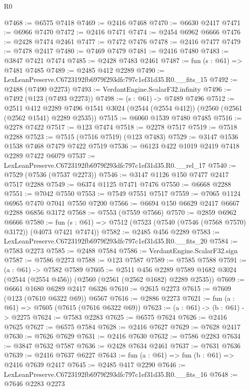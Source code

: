 \begin{lexlean}{R0}
\begin{coremodule}
@7468 := @6575 @7418
@7469 := @2416 @7468
@7470 := @6630 @2417
@7471 := @6966 @7470
@7472 := @2416 @7471
@7474 := @2454 @6962 @6666
@7476 := @2428 @7474 @2461
@7477 := @7472 @7476
@7478 := @2416 @7477
@7479 := @7478 @2417
@7480 := @7469 @7479
@7481 := @2416 @7480
@7483 := @3847 @7421 @7474
@7485 := @2428 @7483 @2461
@7487 := fun (s : @61) => @7481 @7485
@7489 := @2485 @412 @2289
@7490 := LexLeanPreserve.C6723192fb6979f293dfc797c1ef31d35.R0.__fits_15
@7492 := @2488 (@7490 @2273)
@7493 := VerdantEngine.ScalarF32.infinity
@7496 := @7492 (@123 (@7493 @2273))
@7498 := (s : @61) -> @7489 @7496
@7512 := @2511
    @412
    @2289
    @7496
    @1541
    @3024
    (@2544 (@2554 @412))
    (@2560 (@2561 (@2562 @1541) @2289 @2535))
@7515 := @6060 @1539 @7480 @7485
@7516 := @2278 @7422
@7517 := @123 @7474
@7518 := @2278 @7517
@7519 := @7518 @2288
@7523 := @7515 (@7516 @7519) (@123 @7483)
@7529 := @3147 @1536 @1538 @7468 @7479 @7422 @7519
@7536 := @6123 @422 @1019 @2419 @7418 @2289 @7422 @6079
@7537 := LexLeanPreserve.C6723192fb6979f293dfc797c1ef31d35.R0.__rel_17
@7540 := @7529 (@7536 (@7537 @2273))
@7546 := @3147 @1126 @150 @7477 @2417 @7517 @2288
@7549 := @6374 @1125 @7471 @7476
@7550 := @6668 @2288
@7551 := @7042 @7550
@7553 := @7549 @7551 @7517
@7559 := @7065 @1124 @6965 @7470 @7041 @7550 @7200
@7566 := @6694 @150 @6629 @2417 @6667 @2288 @6856 @3172
@7568 := @7553 (@7559 @7566)
@7570 := @2859 @6962 @6666
@7580 := fun (s : @61) => @7512 (@7523 (@7540 (@7546 (@7568 @7570) @3172)) (@4073 @7421 @7474))
@7582 := @2485 @456 @2289
@7583 := LexLeanPreserve.C6723192fb6979f293dfc797c1ef31d35.R0.__fits_20
@7584 := @7583 @2273
@7585 := @2488 @7584
@7586 := VerdantEngine.ScalarF32.sign
@7587 := @7586 @2273
@7588 := @123 @7587
@7589 := @7585 @7588
@7591 := (a : @61) -> @7582 @7589
@7605 := @2511
    @456
    @2289
    @7589
    @1682
    @3024
    (@2544 (@2554 @456))
    (@2560 (@2561 (@2562 @1682) @2289 @2535))
@7609 := @6661 @1680 @6289 @2417 @6326
@7610 := @2615 @2273
@7615 := @7609 (@123 (@7610 @6322 @69)) @6567
@7616 := @2886 @2273
@7621 := fun (a : @61) => @7605 (@7615 (@7616 @6322 @69))
@7623 := (a : @61) -> (b : @61) -> @2275
@7624 := @7583 @2283
@7625 := @6575 @7624
@7626 := @2416 @7625
@7627 := @6575 @7584
@7628 := @2416 @7627
@7629 := @7628 @2417
@7630 := @7626 @7629
@7631 := @2416 @7630
@7632 := @7586 @2283
@7634 := @3847 @7632 @7587
@7636 := @2428 @7634 @2461
@7637 := @7631 @7636
@7639 := @2416 @7637 @6227
@7643 := fun (a : @61) => fun (b : @61) => @2416 @7639 @2417
@7645 := @2485 @417 @2290
@7646 := LexLeanPreserve.C6723192fb6979f293dfc797c1ef31d35.R0.__fits_16
@7648 := @7646 @2283 @2273

\end{coremodule}
\end{lexlean}

